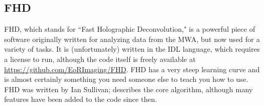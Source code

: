 \subsection{FHD}

FHD, which stands for ``Fast Holographic Deconvolution," is a powerful piece of software originally
written for analyzing data from the MWA, but now used for a variety of tasks.  It is (unfortunately)
written in the IDL language, which requires a license to run, although the code itself is freely
available at \hyperlink{https://github.com/EoRImaging/FHD}{https://github.com/EoRImaging/FHD}.  FHD has
a very steep learning curve and is almost certainly something you need someone else to teach you how to
use.  FHD was written by Ian Sullivan; \cite{sullivan_et_al_2012} describes the core
algorithm, although many features have been added to the code since then.  
